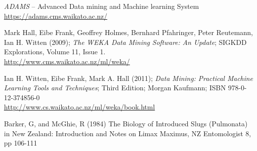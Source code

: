 %

\begin{thebibliography}{999}

		\textit{ADAMS} -- Advanced Data mining and Machine learning System \\
		\url{https://adams.cms.waikato.ac.nz/}{}

	 	Mark Hall, Eibe Frank, Geoffrey Holmes, Bernhard Pfahringer, Peter
	 	Reutemann, Ian H. Witten (2009); \textit{The WEKA Data Mining Software: An
	 	Update}; SIGKDD Explorations, Volume 11, Issue 1. \\
		\url{http://www.cms.waikato.ac.nz/ml/weka/}{}

		Ian H. Witten, Eibe Frank, Mark A. Hall (2011); \textit{Data Mining: Practical
		Machine Learning Tools and Techniques}; Third Edition; Morgan Kaufmann; ISBN
		978-0-12-374856-0 \\
		\url{http://www.cs.waikato.ac.nz/ml/weka/book.html}{}

		Barker, G, and McGhie, R (1984) The Biology of Introduced Slugs (Pulmonata)
		in New Zealand: Introduction and Notes on Limax Maximus, NZ Entomologist 8,
		pp 106-111


\end{thebibliography}
